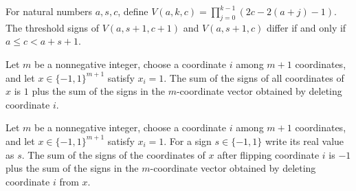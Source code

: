 \begin{theorem}
\label{FABL.thresholdSign_gotsmanLinialLayerValue_succ_ne_iff}
\leanok
{}
For natural numbers $a,s,c$, define $V(a,k,c)=\prod_{j=0}^{k-1}(2c-2(a+j)-1)$. The
threshold signs of $V(a,s+1,c+1)$ and $V(a,s+1,c)$ differ if and only if $a\le
c<a+s+1$.
\end{theorem}

\begin{theorem}
\label{FABL.sum_signValue_dimensionEdge_plus}
\leanok
{}
Let $m$ be a nonnegative integer, choose a coordinate $i$ among $m+1$ coordinates, and
let $x\in\{-1,1\}^{m+1}$ satisfy $x_i=1$. The sum of the signs of all coordinates of $x$
is $1$ plus the sum of the signs in the $m$-coordinate vector obtained by deleting
coordinate $i$.
\end{theorem}

\begin{theorem}
\label{FABL.sum_signValue_dimensionEdge_minus}
\leanok
{}
Let $m$ be a nonnegative integer, choose a coordinate $i$ among $m+1$ coordinates, and
let $x\in\{-1,1\}^{m+1}$ satisfy $x_i=1$. For a sign $s\in\{-1,1\}$ write its real value
as $s$. The sum of the signs of the coordinates of $x$ after flipping coordinate $i$ is
$-1$ plus the sum of the signs in the $m$-coordinate vector obtained by deleting
coordinate $i$ from $x$.
\end{theorem}

